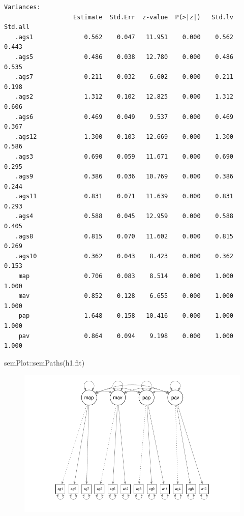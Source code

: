 \documentclass[
  letterpaper,
  DIV=11,
  numbers=noendperiod]{scrreprt}
\newenvironment{Shaded}{\begin{snugshade}}{\end{snugshade}}
\newcommand{\FunctionTok}[1]{\textcolor[rgb]{0.28,0.35,0.67}{#1}}
\newcommand{\NormalTok}[1]{\textcolor[rgb]{0.00,0.23,0.31}{#1}}
\newcommand{\SpecialCharTok}[1]{\textcolor[rgb]{0.37,0.37,0.37}{#1}}
\begin{document}
\begin{verbatim}
Variances:
                   Estimate  Std.Err  z-value  P(>|z|)   Std.lv  Std.all
   .ags1              0.562    0.047   11.951    0.000    0.562    0.443
   .ags5              0.486    0.038   12.780    0.000    0.486    0.535
   .ags7              0.211    0.032    6.602    0.000    0.211    0.198
   .ags2              1.312    0.102   12.825    0.000    1.312    0.606
   .ags6              0.469    0.049    9.537    0.000    0.469    0.367
   .ags12             1.300    0.103   12.669    0.000    1.300    0.586
   .ags3              0.690    0.059   11.671    0.000    0.690    0.295
   .ags9              0.386    0.036   10.769    0.000    0.386    0.244
   .ags11             0.831    0.071   11.639    0.000    0.831    0.293
   .ags4              0.588    0.045   12.959    0.000    0.588    0.405
   .ags8              0.815    0.070   11.602    0.000    0.815    0.269
   .ags10             0.362    0.043    8.423    0.000    0.362    0.153
    map               0.706    0.083    8.514    0.000    1.000    1.000
    mav               0.852    0.128    6.655    0.000    1.000    1.000
    pap               1.648    0.158   10.416    0.000    1.000    1.000
    pav               0.864    0.094    9.198    0.000    1.000    1.000
\end{verbatim}

\begin{Shaded}
\begin{Highlighting}[]
\NormalTok{semPlot}\SpecialCharTok{::}\FunctionTok{semPaths}\NormalTok{(h1.fit)}
\end{Highlighting}
\end{Shaded}

\begin{figure}[H]

{\centering \includegraphics{./traditional-cfa-workflow_files/figure-pdf/unnamed-chunk-6-1.pdf}

}

\end{figure}
\end{document}
